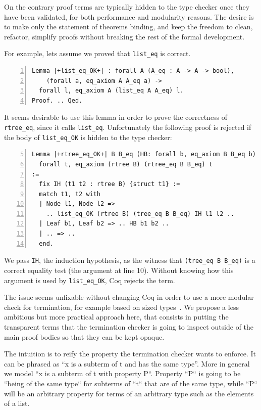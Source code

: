 \documentclass[sigplan,10pt,review]{acmart}\settopmatter{printfolios=true,printccs=false,printacmref=false}
\begin{document}
On the contrary proof terms are typically hidden to the type checker once
they have been validated, for both performance and modularity reasons.
The desire is to make only the statement of theorems binding, and keep
the freedom to clean, refactor, simplify proofs without breaking
the rest of the formal development. 

For example, lets assume we proved that \lstinline+list_eq+ is
correct.

\begin{minipage}{\textwidth}\begin{lstlisting}[numbers=left]
Lemma |+list_eq_OK+| : forall A (A_eq : A -> A -> bool),
    (forall a, eq_axiom A A_eq a) ->
  forall l, eq_axiom A (list_eq A A_eq) l.
Proof. .. Qed.
\end{lstlisting}\end{minipage}

\noindent
It seems desirable to use this lemma in order to prove the
correctness of \lstinline+rtree_eq+, since it calls
\lstinline+list_eq+.
Unfortunately the following proof is rejected if the body of
\lstinline+list_eq_OK+ is hidden to the type checker:

\begin{minipage}{\textwidth}\begin{lstlisting}[numbers=left,firstnumber=5]
Lemma |+rtree_eq_OK+| B B_eq (HB: forall b, eq_axiom B B_eq b) :
  forall t, eq_axiom (rtree B) (rtree_eq B B_eq) t
:= 
  fix IH (t1 t2 : rtree B) {struct t1} :=
  match t1, t2 with
  | Node l1, Node l2 =>
    .. list_eq_OK (rtree B) (tree_eq B B_eq) IH l1 l2 ..
  | Leaf b1, Leaf b2 => .. HB b1 b2 ..
  | .. => ..
  end.
\end{lstlisting}\end{minipage}

\noindent
We pass \lstinline+IH+, the induction hypothesis, as the
witness that \lstinline+(tree_eq B B_eq)+ is a correct equality test
(the argument at line 10). Without knowing how this argument is used
by \lstinline+list_eq_OK+, Coq rejects the term.

The issue seems unfixable without changing Coq in order to use a more
modular check for termination, for example based on sized
types~\cite{sacchini:pastel-00622429}.
We propose a less ambitious but more practical approach here, that
consists in putting the transparent terms that the termination checker
is going to inspect outside of the main proof bodies so that they can be 
kept opaque.

The intuition is to reify the property the termination checker wants
to enforce. It can be phrased as ``x is a subterm of t and has the same
type''. More in general we model ``x is a subterm of t with property
P``. Property ``P`` is going to be ``being of the same type`` 
for subterms of ``t`` that are of the same type, while ``P`` 
will be an arbitrary property for terms of an arbitrary type such 
as the elements of a list.
\end{document}
